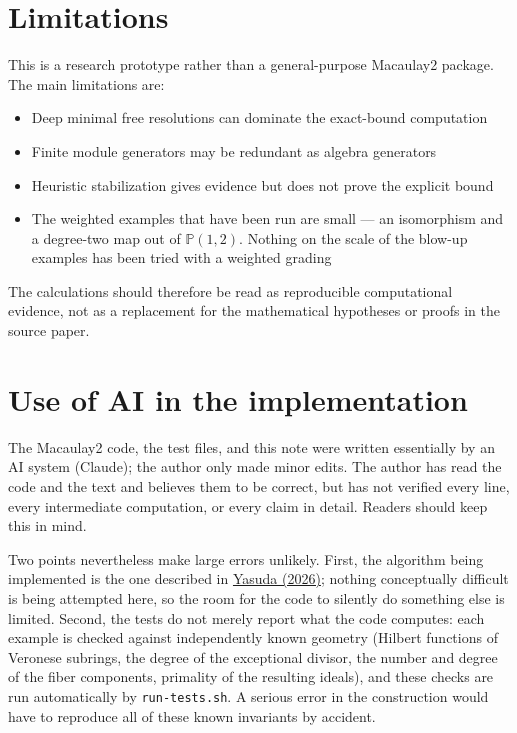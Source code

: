 \documentclass[11pt,reqno]{amsart}
\newcommand{\PP}{\ensuremath{\mathbb{P}}}
\theoremstyle{plain}
\theoremstyle{definition}
\begin{document}
\section{Limitations}\label{sec:limitations}

This is a research prototype rather than a general-purpose Macaulay2
package. The main limitations are:

\begin{itemize}
\item
  Deep minimal free resolutions can dominate the exact-bound computation
\item
  Finite module generators may be redundant as algebra generators
\item
  Heuristic stabilization gives evidence but does not prove the explicit
  bound
\item
  The weighted examples that have been run are small --- an isomorphism
  and a degree-two map out of \(\PP(1,2)\). Nothing on the scale of the
  blow-up examples has been tried with a weighted grading
\end{itemize}

The calculations should therefore be read as reproducible computational
evidence, not as a replacement for the mathematical hypotheses or proofs
in the source paper.

\section{Use of AI in the implementation}\label{sec:ai}

The Macaulay2 code, the test files, and this note were written
essentially by an AI system (Claude); the author only made minor edits.
The author has read the code and the text and believes them to be
correct, but has not verified every line, every intermediate
computation, or every claim in detail. Readers should keep this in mind.

Two points nevertheless make large errors unlikely. First, the algorithm
being implemented is the one described in \hyperref[sec:references]{Yasuda
(2026)}; nothing conceptually difficult is being attempted here, so the
room for the code to silently do something else is limited. Second, the
tests do not merely report what the code computes: each example is
checked against independently known geometry (Hilbert functions of
Veronese subrings, the degree of the exceptional divisor, the number and
degree of the fiber components, primality of the resulting ideals), and
these checks are run automatically by \texttt{run-tests.sh}. A serious
error in the construction would have to reproduce all of these known
invariants by accident.
\end{document}
